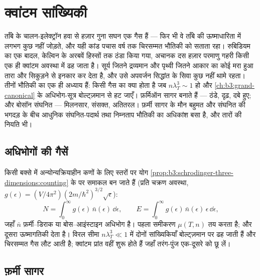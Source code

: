 \chapter{क्वांटम सांख्यिकी}\label{ch:b3:quantum-statistics}

ताँबे के चालन-इलेक्ट्रॉन हवा से हज़ार गुना सघन एक गैस हैं --- फिर भी
वे ताँबे की ऊष्माधारिता में लगभग कुछ नहीं जोड़ते, और यही कांड पचास
वर्ष तक चिरसम्मत भौतिकी को सताता रहा। रुबिडियम का एक बादल, केल्विन के
अरबवें हिस्सों तक ठंडा किया गया, अचानक दस हज़ार परमाणु गहरी किसी एक
ही क्वांटम अवस्था में ढह जाता है। सूर्य जितने द्रव्यमान और पृथ्वी
जितने आकार का कोई मरा हुआ तारा और सिकुड़ने से इनकार कर देता है, और
उसे अपवर्जन सिद्धांत के सिवा कुछ नहीं थामे रहता। तीनों भौतिकी का एक ही
अध्याय हैं: किसी गैस का क्या होता है जब $n\lambda_T^3 \sim 1$ हो और
\cref{ch:b3:grand-canonical} के अधिभोग-सूत्र बोल्ट्ज़मान से हट जाएँ।
फ़र्मिऑन सागर बनाते हैं --- ठंडे, दृढ़, दबे हुए; और बोसॉन संघनित ---
मिलनसार, संसक्त, अतितरल। फ़र्मी सागर के मौन बहुमत और संघनित की भगदड़
के बीच आधुनिक संघनित-पदार्थ तथा निम्नताप भौतिकी का अधिकांश बसा है,
और तारों की नियति भी।

\section{अधिभोगों की गैसें}

\begin{proposition}[क्वांटम गैस का यंत्र]\label{prop:b3:quantum-statistics:machinery}
किसी बक्से में अन्योन्यक्रियाहीन कणों के लिए स्तरों पर योग
\cref{prop:b3:schrodinger-three-dimensions:counting} के 
पर समाकल बन जाते हैं (प्रति चक्रण
अवस्था, $g(\epsilon) = (V/4\pi^2)(2m/\hbar^2)^{3/2}\sqrt\epsilon$):
\[
N = \int_0^\infty g(\epsilon)\,\bar n(\epsilon)\,\dd\epsilon ,
\qquad
E = \int_0^\infty g(\epsilon)\,\bar n(\epsilon)\,\epsilon\,
\dd\epsilon ,
\]
जहाँ $\bar n$ फ़र्मी--डिराक या बोस--आइंस्टाइन अधिभोग है। पहला
समीकरण $\mu(T, n)$ तय करता है; और दूसरा
ऊष्मागतिकी देता है। विरल सीमा $n\lambda_T^3 \ll 1$ में दोनों
सांख्यिकियाँ बोल्ट्ज़मान पर ढह जाती हैं और चिरसम्मत गैस लौट आती है;
क्वांटम प्रांत वहीं शुरू होते हैं जहाँ तरंग-पुंज एक-दूसरे को छू लें।
\end{proposition}
\admitted

\section{फ़र्मी सागर}

